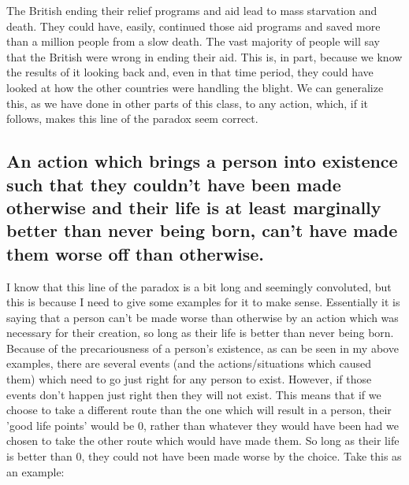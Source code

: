 The British ending their relief programs and aid lead to mass starvation and death. They could have, easily, continued those aid programs and saved more than a million people from a slow death. The vast majority of people will say that the British were wrong in ending their aid. This is, in part, because we know the results of it looking back and, even in that time period, they could have looked at how the other countries were handling the blight. We can generalize this, as we have done in other parts of this class, to any action, which, if it follows, makes this line of the paradox seem correct. 

\subsection{An action which brings a person into existence such that they couldn’t have been made otherwise and their life is at least marginally better than never being born, can’t have made them worse off than otherwise.}

I know that this line of the paradox is a bit long and seemingly convoluted, but this is because I need to give some examples for it to make sense. Essentially it is saying that a person can't be made worse than otherwise by an action which was necessary for their creation, so long as their life is better than never being born. Because of the precariousness of a person's existence, as can be seen in my above examples, there are several events (and the actions/situations which caused them) which need to go just right for any person to exist. However, if those events don't happen just right then they will not exist. This means that if we choose to take a different route than the one which will result in a person, their 'good life points' would be 0, rather than whatever they would have been had we chosen to take the other route which would have made them. So long as their life is better than 0, they could not have been made worse by the choice. Take this as an example:

